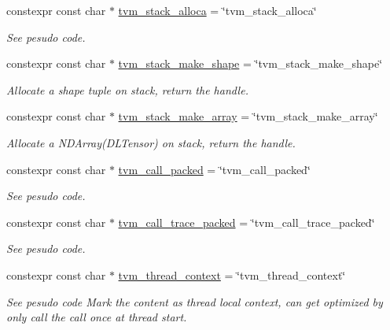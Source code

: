 \begin{DoxyCompactItemize}
constexpr const char $\ast$ \hyperlink{namespacetvm_1_1tir_1_1intrinsic_a204b4be973bdf3e0c82f56a1273752bb}{tvm\+\_\+stack\+\_\+alloca} = \char`\"{}tvm\+\_\+stack\+\_\+alloca\char`\"{}
\begin{DoxyCompactList}\small\item\em See pesudo code. \end{DoxyCompactList}\item 
constexpr const char $\ast$ \hyperlink{namespacetvm_1_1tir_1_1intrinsic_aab2d9941d781b4b5bb399cffb9488fd6}{tvm\+\_\+stack\+\_\+make\+\_\+shape} = \char`\"{}tvm\+\_\+stack\+\_\+make\+\_\+shape\char`\"{}
\begin{DoxyCompactList}\small\item\em Allocate a shape tuple on stack, return the handle. \end{DoxyCompactList}\item 
constexpr const char $\ast$ \hyperlink{namespacetvm_1_1tir_1_1intrinsic_ab210d3708ad9206af139d76f29727ab4}{tvm\+\_\+stack\+\_\+make\+\_\+array} = \char`\"{}tvm\+\_\+stack\+\_\+make\+\_\+array\char`\"{}
\begin{DoxyCompactList}\small\item\em Allocate a N\+D\+Array(\+D\+L\+Tensor) on stack, return the handle. \end{DoxyCompactList}\item 
constexpr const char $\ast$ \hyperlink{namespacetvm_1_1tir_1_1intrinsic_ac49ed1daf574a2544c8d3cbe3110d6c9}{tvm\+\_\+call\+\_\+packed} = \char`\"{}tvm\+\_\+call\+\_\+packed\char`\"{}
\begin{DoxyCompactList}\small\item\em See pesudo code. \end{DoxyCompactList}\item 
constexpr const char $\ast$ \hyperlink{namespacetvm_1_1tir_1_1intrinsic_a7127f9ff70e7e124403e6a22de1a82f3}{tvm\+\_\+call\+\_\+trace\+\_\+packed} = \char`\"{}tvm\+\_\+call\+\_\+trace\+\_\+packed\char`\"{}
\begin{DoxyCompactList}\small\item\em See pesudo code. \end{DoxyCompactList}\item 
constexpr const char $\ast$ \hyperlink{namespacetvm_1_1tir_1_1intrinsic_a3480cec5a6cf03c2cc894d6f889d1f39}{tvm\+\_\+thread\+\_\+context} = \char`\"{}tvm\+\_\+thread\+\_\+context\char`\"{}
\begin{DoxyCompactList}\small\item\em See pesudo code Mark the content as thread local context, can get optimized by only call the call once at thread start. \end{DoxyCompactList}\item 

\end{DoxyCompactItemize}
